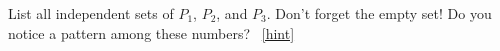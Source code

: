 \documentclass{book}
\begin{document}
\setcounter{project}{132}
\addtocounter{project}{-1}
\begin{activity}[]\label{activity-125}
\hypertarget{p-925}{}%
List all independent sets of \(P_1\), \(P_2\), and \(P_3\).  Don't forget the empty set! Do you notice a pattern among these numbers?%
~\hfill{\tiny\hyperlink{a-132}{[hint]}\hypertarget{q-132}{}}\end{activity}
\end{document}
